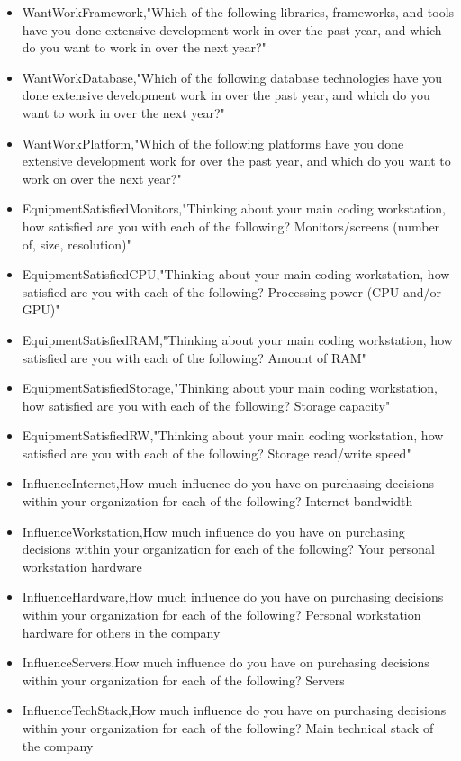 \begin{appendices}
\begin{itemize}
        \item WantWorkFramework,"Which of the following libraries, frameworks, and tools have you done extensive development work in over the past year, and which do you want to work in over the next year?"
        \item WantWorkDatabase,"Which of the following database technologies have you done extensive development work in over the past year, and which do you want to work in over the next year?"
        \item WantWorkPlatform,"Which of the following platforms have you done extensive development work for over the past year, and which do you want to work on over the next year?"
        \item EquipmentSatisfiedMonitors,"Thinking about your main coding workstation, how satisfied are you with each of the following? Monitors/screens (number of, size, resolution)"
        \item EquipmentSatisfiedCPU,"Thinking about your main coding workstation, how satisfied are you with each of the following? Processing power (CPU and/or GPU)"
        \item EquipmentSatisfiedRAM,"Thinking about your main coding workstation, how satisfied are you with each of the following? Amount of RAM"
        \item EquipmentSatisfiedStorage,"Thinking about your main coding workstation, how satisfied are you with each of the following? Storage capacity"
        \item EquipmentSatisfiedRW,"Thinking about your main coding workstation, how satisfied are you with each of the following? Storage read/write speed"
        \item InfluenceInternet,How much influence do you have on purchasing decisions within your organization for each of the following? Internet bandwidth
        \item InfluenceWorkstation,How much influence do you have on purchasing decisions within your organization for each of the following? Your personal workstation hardware
        \item InfluenceHardware,How much influence do you have on purchasing decisions within your organization for each of the following? Personal workstation hardware for others in the company
        \item InfluenceServers,How much influence do you have on purchasing decisions within your organization for each of the following? Servers
        \item InfluenceTechStack,How much influence do you have on purchasing decisions within your organization for each of the following? Main technical stack of the company

\end{itemize}
\end{appendices}
